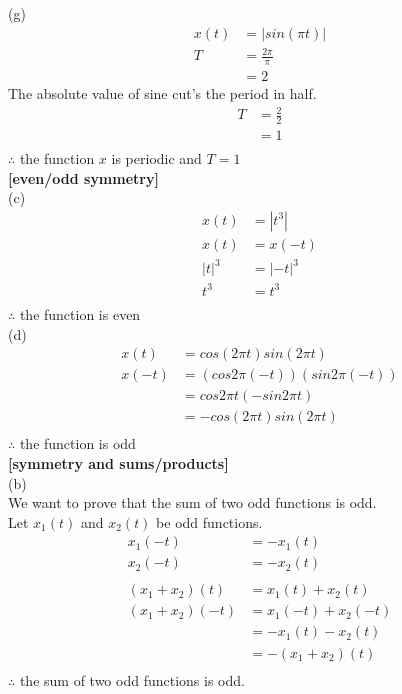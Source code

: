 \documentclass{article}
\begin{document}
(g)
\begin{equation*}
\begin{split}
    x(t) &= |sin(\pi t)|\\
    T &= \frac{2\pi}{\pi}\\
    &= 2
\end{split}
\end{equation*}
The absolute value of sine cut's the period in half.\\
\begin{equation*}
\begin{split}
    T &= \frac{2}{2}\\
    &= 1\\
\end{split}
\end{equation*}
$\therefore$ the function $x$ is periodic and $T = 1$\\


 {\bf [even/odd symmetry]}\\
(c)
\begin{equation*}
\begin{split}
    x(t) &= |t^3|\\
    x(t) &= x(-t)\\
    |t|^3 &= |-t|^3\\
    t^3 &= t^3\\
\end{split}
\end{equation*}
$\therefore$ the function is even\\

(d)
\begin{equation*}
\begin{split}
    x(t) &= cos(2 \pi t) sin(2 \pi t)\\
    x(-t) &= (cos 2 \pi(-t))(sin 2 \pi(-t))\\
    &= cos 2\pi t(-sin2 \pi t)\\
    &= -cos(2 \pi t) sin (2 \pi t)\\
\end{split}
\end{equation*}
$\therefore$ the function is odd\\


 {\bf [symmetry and sums/products]}\\
(b)\\
We want to prove that the sum of two odd functions is odd.\\
Let $x_1(t)$ and $x_2(t)$ be odd functions.
\begin{equation*}
\begin{split}
    x_1(-t) &= -x_1(t)\\
    x_2(-t) &= -x_2(t)\\\\
    (x_1 + x_2)(t) &= x_1(t) + x_2(t)\\
    (x_1 + x_2)(-t) &= x_1(-t) + x_2(-t)\\
    &= -x_1(t) - x_2(t)\\
    &= -(x_1 + x_2)(t)\\
\end{split}
\end{equation*}
$\therefore$ the sum of two odd functions is odd.
\end{document}
